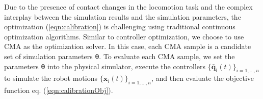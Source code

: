 Due to the presence of contact changes in the locomotion task and the complex interplay between the simulation results and the simulation parameters, the optimization (\ref{eqn:calibration}) is challenging using traditional continuous optimization algorithms. Similar to controller optimization, we choose to use CMA as the optimization solver. In this case, each CMA sample is a candidate set of simulation parameters $\mathbf{\theta}$. To evaluate each CMA sample, we set the parameters $\mathbf{\theta}$ into the physical simulator, execute the controllers $\{\bar{\mathbf{q}}_i(t)\}_{i=1,...,n}$ to simulate the robot motions $\{\mathbf{x}_i(t)\}_{i=1,...,n}$, and then evaluate the objective function eq. (\ref{eqn:calibrationObj}).

